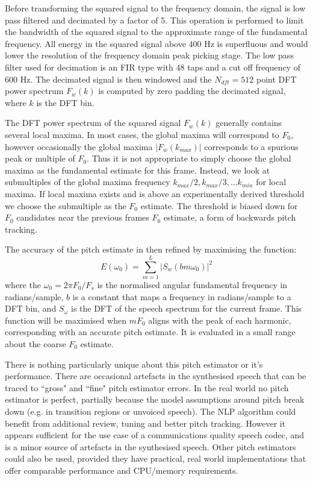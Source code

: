 \documentclass{article}
\begin{document}
Before transforming the squared signal to the frequency domain, the signal is low pass filtered and decimated by a factor of 5. This operation is performed to limit the bandwidth of the squared signal to the approximate range of the fundamental frequency. All energy in the squared signal above 400 Hz is superfluous and would lower the resolution of the frequency domain peak picking stage. The low pass filter used for decimation is an FIR type with 48 taps and a cut off frequency of 600 Hz. The decimated signal is then windowed and the $N_{dft} = 512$ point DFT power spectrum $F_w(k)$ is computed by zero padding the decimated signal, where $k$ is the DFT bin.

The DFT power spectrum of the squared signal $F_w(k)$ generally contains several local maxima. In most cases, the global maxima will correspond to $F_0$, however occasionally the global maxima $|F_w(k_{max})|$ corresponds to a spurious peak or multiple of $F_0$. Thus it is not appropriate to simply choose the global maxima as the fundamental estimate for this frame. Instead, we look at submultiples of the global maxima frequency $k_{max}/2, k_{max}/3,... k_{min}$ for local maxima.  If local maxima exists and is above an experimentally derived threshold we choose the submultiple as the $F_0$ estimate.  The threshold is biased down for $F_0$ candidates near the previous frames $F_0$ estimate, a form of backwards pitch tracking.

The accuracy of the pitch estimate in then refined by maximising the function:
\begin{equation}
E(\omega_0)=\sum_{m=1}^L|S_w(b m \omega_0)|^2
\end{equation}
where the $\omega_0=2 \pi F_0 /F_s$ is the normalised angular fundamental frequency in radians/sample, $b$ is a constant that maps a frequency in radians/sample to a DFT bin, and $S_\omega$ is the DFT of the speech spectrum for the current frame. This function will be maximised when $mF_0$ aligns with the peak of each harmonic, corresponding with an accurate pitch estimate.   It is evaluated in a small range about the coarse $F_0$ estimate.

There is nothing particularly unique about this pitch estimator or it's performance. There are occasional artefacts in the synthesised speech that can be traced to ``gross" and ``fine" pitch estimator errors.  In the real world no pitch estimator is perfect, partially because the model assumptions around pitch break down (e.g. in transition regions or unvoiced speech).  The NLP algorithm could benefit from additional review, tuning and better pitch tracking.  However it appears sufficient for the use case of a communications quality speech codec, and is a minor source of artefacts in the synthesised speech. Other pitch estimators could also be used, provided they have practical, real world implementations that offer comparable performance and CPU/memory requirements.
\end{document}
